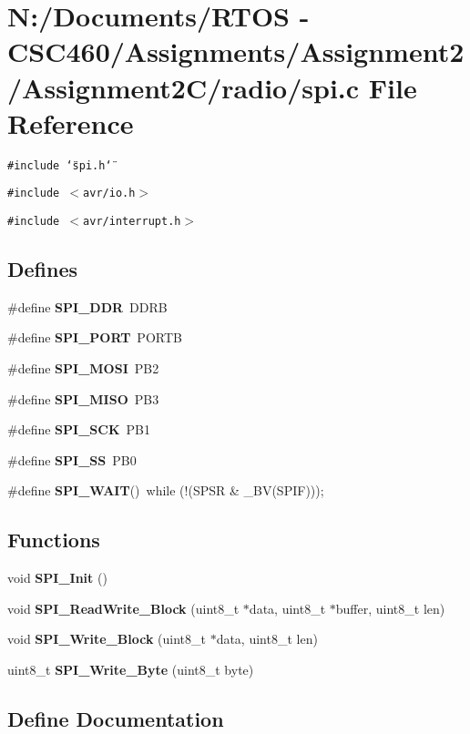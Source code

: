 \section{N:/Documents/RTOS - CSC460/Assignments/Assignment2/Assignment2C/radio/spi.c File Reference}
\label{spi_8c}
{\tt \#include \char`\"{}spi.h\char`\"{}}\par
{\tt \#include $<$avr/io.h$>$}\par
{\tt \#include $<$avr/interrupt.h$>$}\par
\subsection*{Defines}
\begin{CompactItemize}
\item 
\#define {\bf SPI\_\-DDR}~DDRB
\item 
\#define {\bf SPI\_\-PORT}~PORTB
\item 
\#define {\bf SPI\_\-MOSI}~PB2
\item 
\#define {\bf SPI\_\-MISO}~PB3
\item 
\#define {\bf SPI\_\-SCK}~PB1
\item 
\#define {\bf SPI\_\-SS}~PB0
\item 
\#define {\bf SPI\_\-WAIT}()~while (!(SPSR \& \_\-BV(SPIF)));
\end{CompactItemize}
\subsection*{Functions}
\begin{CompactItemize}
\item 
void {\bf SPI\_\-Init} ()
\item 
void {\bf SPI\_\-Read\-Write\_\-Block} (uint8\_\-t $\ast$data, uint8\_\-t $\ast$buffer, uint8\_\-t len)
\item 
void {\bf SPI\_\-Write\_\-Block} (uint8\_\-t $\ast$data, uint8\_\-t len)
\item 
uint8\_\-t {\bf SPI\_\-Write\_\-Byte} (uint8\_\-t byte)
\end{CompactItemize}


\subsection{Define Documentation}

